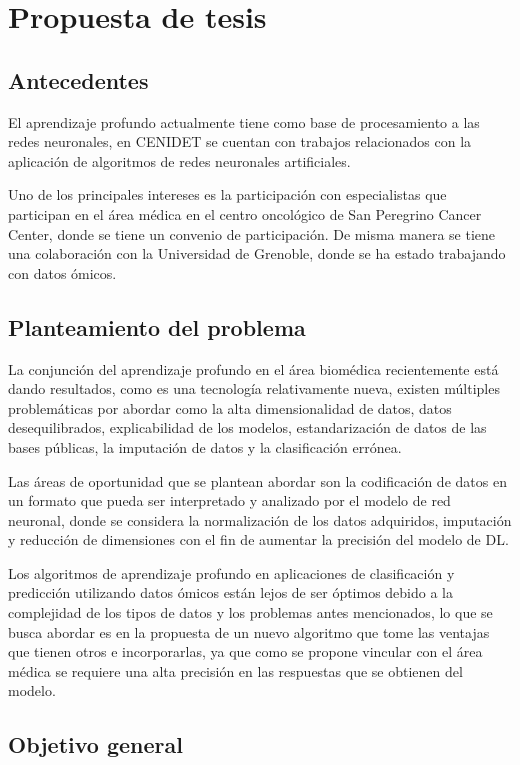 \section{Propuesta de tesis}

\subsection{Antecedentes}

El aprendizaje profundo actualmente tiene como base de procesamiento a las redes neuronales, en CENIDET se cuentan con trabajos relacionados con la aplicación de algoritmos de redes neuronales artificiales.

Uno de los principales intereses es la participación con especialistas que participan en el área médica en el centro oncológico de San Peregrino Cancer Center, donde se tiene un convenio de participación. De misma manera se tiene una colaboración con la Universidad de Grenoble, donde se ha estado trabajando con datos ómicos.


\subsection{Planteamiento del problema}

La conjunción del aprendizaje profundo en el área biomédica recientemente está dando resultados, como es una tecnología relativamente nueva, existen múltiples problemáticas por abordar como la alta dimensionalidad de datos, datos desequilibrados, explicabilidad de los modelos, estandarización de datos de las bases públicas, la imputación de datos y la clasificación errónea.

Las áreas de oportunidad que se plantean abordar son la codificación de datos en un formato que pueda ser interpretado y analizado por el modelo de red neuronal, donde se considera la normalización de los datos adquiridos, imputación y reducción de dimensiones con el fin de aumentar la precisión del modelo de DL.

Los algoritmos de aprendizaje profundo en aplicaciones de clasificación y predicción utilizando datos ómicos están lejos de ser óptimos debido a la complejidad de los tipos de datos y los problemas antes mencionados, lo que se busca abordar es en la propuesta de un nuevo algoritmo que tome las ventajas que tienen otros e incorporarlas, ya que como se propone vincular con el área médica se requiere una alta precisión en las respuestas que se obtienen del modelo.

\subsection{Objetivo general}

